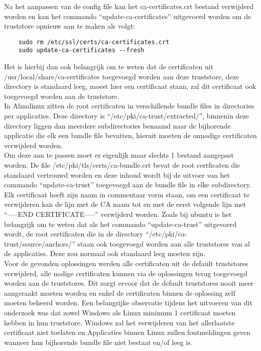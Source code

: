 Na het aanpassen van de config file kan het ca-certificates.crt bestand verwijderd worden en kan het commando ``update-ca-certificates'' uitgevoerd worden om de truststore opnieuw aan te maken als volgt:
\begin{verbatim}
    sudo rm /etc/ssl/certs/ca-certificates.crt
    sudo update-ca-certificates --fresh
\end{verbatim}
Het is hierbij dan ook belangrijk om te weten dat de certificaten uit /usr/local/share/ca-certificates toegevoegd worden aan deze truststore, deze directory is standaard leeg, moest hier een certificaat staan, zal dit certificaat ook toegevoegd worden aan de truststore. \\

In Almalinux zitten de root certificaten in verschillende bundle files in directories per applicaties. Deze directory is ``/etc/pki/ca-trust/extracted/'', binnenin deze directory liggen dan meerdere subdirectories benaamd naar de bijhorende applicatie die elk een bundle file bevatten, hieruit moeten de onnodige certificaten verwijderd worden. \\

Om deze aan te passen moet er eigenlijk maar slechts 1 bestand aangepast worden. De file /etc/pki/tls/certs/ca-bundle.crt bevat de root certficaten die standaard vertrouwd worden en deze inhoud wordt bij de uitvoer van het commando ``update-ca-trust'' toegevoegd aan de bundle file in elke subdirectory.
Elk certificaat heeft zijn naam in commentaar vorm staan, om een certificaat te verwijderen kan de lijn met de CA naam tot en met de eerst volgende lijn met ``-----END CERTIFICATE-----'' verwijderd worden.
Zoals bij ubuntu is het belangrijk om te weten dat als het commando ``update-ca-trust'' uitgevoerd wordt, de root certificaten die in de directory ``/etc/pki/ca-trust/source/anchors/'' staan ook toegevoegd worden aan alle truststores van al de applicaties. Deze zou normaal ook standaard leeg moeten zijn. \\

Voor de gevonden oplossingen werden alle certificaten uit de default truststores verwijderd, alle nodige certificaten kunnen via de oplossingen terug toegevoegd worden aan de truststores. Dit zorgt ervoor dat de default truststores nooit meer aangeraakt moeten worden en enkel de certificaten binnen de oplossing zelf moeten beheerd worden.
Een belangrijke observatie tijdens het uitvoeren van dit onderzoek was dat zowel Windows als Linux minimum 1 certificaat moeten hebben in hun truststore, Windows zal het verwijderen van het allerlaatste certificaat niet toelaten en Applicaties binnen Linux zullen foutmeldingen geven wanneer hun bijhorende bundle file niet bestaat en/of leeg is. \\

